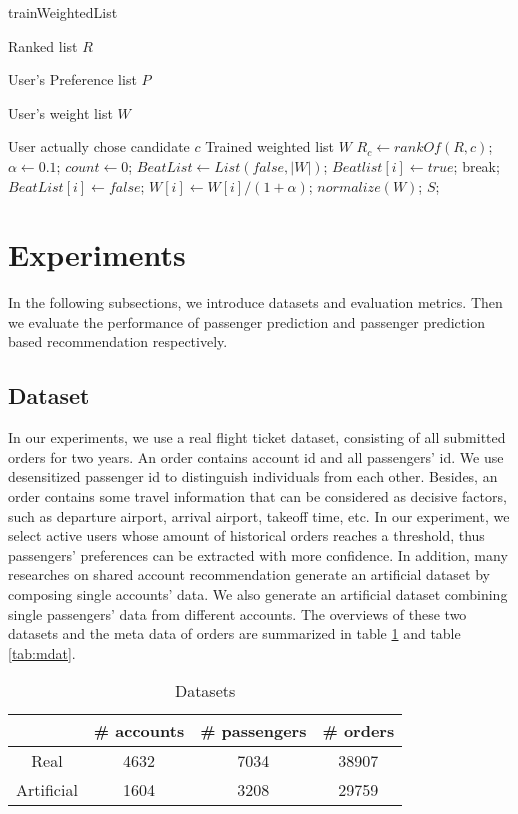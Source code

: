 \documentclass{llncs}
\begin{document}
\begin{algorithm}[htb]
\caption{trainWeightedList}
\begin{algorithmic}[1]
\label{alg:6}
\REQUIRE \par
Ranked list $R$ \par
User's Preference list $P$ \par
User's weight list $W$ \par
User actually chose candidate $c$
\ENSURE Trained weighted list $W$
\STATE $R_c \leftarrow rankOf(R,c)$;
\STATE $\alpha \leftarrow 0.1$;
\STATE $count \leftarrow 0$;
\STATE $BeatList \leftarrow List(false,|W|)$;
\STATE $Beatlist[i] \leftarrow true$;
\STATE break;
\ENDIF
\ENDFOR
{}
\STATE $BeatList[i] \leftarrow false$;
\STATE $W[i] \leftarrow W[i] / (1+\alpha)$;
\ENDIF
\ENDFOR
\ENDWHILE
\STATE $normalize(W)$;
\RETURN $S$;
\end{algorithmic} 
\end{algorithm}


\section{Experiments}
\label{sec:exp}
In the following subsections, we introduce datasets and evaluation metrics. Then we evaluate the performance of passenger prediction and passenger prediction based recommendation respectively.
\subsection{Dataset}
In our experiments, we use a real flight ticket dataset, consisting of all submitted orders for two years. An order contains account id and all passengers' id. We use desensitized passenger id to distinguish individuals from each other. Besides, an order contains some travel information that can be considered as decisive factors, such as departure airport, arrival airport, takeoff time, etc. In our experiment, we select active users whose amount of historical orders reaches a threshold, thus passengers' preferences can be extracted with more confidence. In addition, many researches\cite{amy:guess}\cite{yutaka:modeling} on shared account recommendation generate an artificial dataset by composing single accounts' data. We also generate an artificial dataset combining single passengers' data from different accounts. The overviews of these two datasets and the meta data of orders are summarized in table \ref{tab:dat} and table \ref{tab:mdat}.
\begin{table}[!htbp]
\centering
\caption{\label{tab:dat}Datasets}
\begin{tabular}{|c|c|c|c|} \hline
& \# accounts & \# passengers & \# orders\\ \hline
Real & 4632&7034&38907 \\ \hline
Artificial &1604&3208&29759\\ \hline
\end{tabular}
\end{table}
\end{document}
